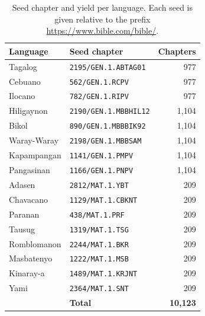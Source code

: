 \begin{table}[h!]
    \centering
    \footnotesize
    \begin{tabular}{llr}
        \hline
        \textbf{Language} & \textbf{Seed chapter}        & \textbf{Chapters} \\
        \hline
        Tagalog           & \texttt{2195/GEN.1.ABTAG01}  & 977               \\
        Cebuano           & \texttt{562/GEN.1.RCPV}      & 977               \\
        Ilocano           & \texttt{782/GEN.1.RIPV}      & 977               \\
        Hiligaynon        & \texttt{2190/GEN.1.MBBHIL12} & 1{,}104           \\
        Bikol             & \texttt{890/GEN.1.MBBBIK92}  & 1{,}104           \\
        Waray-Waray       & \texttt{2198/GEN.1.MBBSAM}   & 1{,}104           \\
        Kapampangan       & \texttt{1141/GEN.1.PMPV}     & 1{,}104           \\
        Pangasinan        & \texttt{1166/GEN.1.PNPV}     & 1{,}104           \\
        Adasen            & \texttt{2812/MAT.1.YBT}      & 209               \\
        Chavacano         & \texttt{1129/MAT.1.CBKNT}    & 209               \\
        Paranan           & \texttt{438/MAT.1.PRF}       & 209               \\
        Tausug            & \texttt{1319/MAT.1.TSG}      & 209               \\
        Romblomanon       & \texttt{2244/MAT.1.BKR}      & 209               \\
        Masbatenyo        & \texttt{1222/MAT.1.MSB}      & 209               \\
        Kinaray-a         & \texttt{1489/MAT.1.KRJNT}    & 209               \\
        Yami              & \texttt{2364/MAT.1.SNT}      & 209               \\
        \hline
                          & \textbf{Total}               & \textbf{10{,}123} \\
        \hline
    \end{tabular}
    \caption{Seed chapter and yield per language. Each seed is given relative to
        the prefix \url{https://www.bible.com/bible/}.}\label{tab:seeds}
\end{table}

